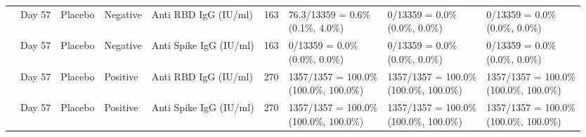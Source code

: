 \documentclass[]{book}
\theoremstyle{definition}
\theoremstyle{definition}
\theoremstyle{definition}
\newcommand{\1}{\mathbbm{1}}
\begin{document}
\begin{landscape}
\begin{ThreePartTable}
\begin{longtable}[t]{>{\raggedright\arraybackslash}p{2.7cm}llllllll}
\hspace{1em} & Day 57 & Placebo & Negative & Anti RBD IgG (IU/ml) & 163 & \makecell[l]{76.3/13359 = 0.6\%\\(0.1\%, 4.0\%)} & \makecell[l]{0/13359 = 0.0\%\\(0.0\%, 0.0\%)} & \makecell[l]{0/13359 = 0.0\%\\(0.0\%, 0.0\%)}\\
\hspace{1em} & Day 57 & Placebo & Negative & Anti Spike IgG (IU/ml) & 163 & \makecell[l]{0/13359 = 0.0\%\\(0.0\%, 0.0\%)} & \makecell[l]{0/13359 = 0.0\%\\(0.0\%, 0.0\%)} & \makecell[l]{0/13359 = 0.0\%\\(0.0\%, 0.0\%)}\\
\hspace{1em} & Day 57 & Placebo & Positive & Anti RBD IgG (IU/ml) & 270 & \makecell[l]{1357/1357 = 100.0\%\\(100.0\%, 100.0\%)} & \makecell[l]{1357/1357 = 100.0\%\\(100.0\%, 100.0\%)} & \makecell[l]{1357/1357 = 100.0\%\\(100.0\%, 100.0\%)}\\
\hspace{1em} & Day 57 & Placebo & Positive & Anti Spike IgG (IU/ml) & 270 & \makecell[l]{1357/1357 = 100.0\%\\(100.0\%, 100.0\%)} & \makecell[l]{1357/1357 = 100.0\%\\(100.0\%, 100.0\%)} & \makecell[l]{1357/1357 = 100.0\%\\(100.0\%, 100.0\%)}\\*
\end{longtable}
\end{ThreePartTable}


\clearpage


\end{landscape}
\end{document}
